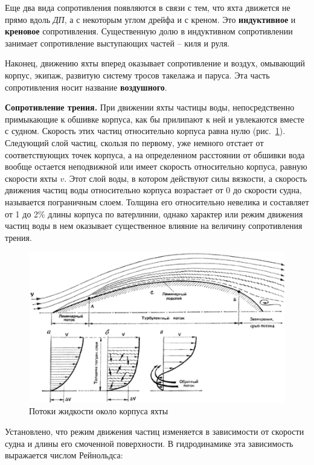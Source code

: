 \documentclass[a4paper, 12pt, twoside, final, book, russian, fittopage, cyremdash]{ncc}
\newcommand{\ris}[1]{\ref{fig:#1}}
\begin{document}
Еще два вида сопротивления появляются в связи с тем, что яхта движется не прямо вдоль \textit{ДП}, а с некоторым углом дрейфа и с креном. Это \textbf{индуктивное} и \textbf{креновое} сопротивления. Существенную долю в индуктивном сопротивлении занимает сопротивление выступающих частей \--- киля и руля.

Наконец, движению яхты вперед оказывает сопротивление и воздух, омывающий корпус, экипаж, развитую систему тросов такелажа и паруса. Эта часть сопротивления носит название \textbf{воздушного}. 

\textbf{Сопротивление трения.} При движении яхты частицы воды, непосредственно примыкающие к обшивке корпуса, как бы прилипают к ней и увлекаются вместе с судном. Скорость этих частиц относительно корпуса равна нулю (рис.~\ris{14}). Следующий слой частиц, скользя по первому, уже немного отстает от соответствующих точек корпуса, а на определенном расстоянии от обшивки вода вообще остается неподвижной или имеет скорость относительно корпуса, равную скорости яхты $v$. Этот слой воды, в котором действуют силы вязкости, а скорость движения частиц воды относительно корпуса возрастает от 0 до скорости судна, называется пограничным слоем. Толщина его относительно невелика и составляет от 1 до 2\% длины корпуса по ватерлинии, однако характер или режим движения частиц воды в нем оказывает существенное влияние на величину сопротивления трения.

\begin{figure}[htb]
  \centering
  \includegraphics[scale=0.5]{0014.jpg}
  \caption{Потоки жидкости около корпуса яхты}
  \label{fig:14}
\end{figure}

Установлено, что режим движения частиц изменяется в зависимости от скорости судна и длины его смоченной поверхности. В гидродинамике эта зависимость выражается числом Рейнольдса:
\end{document}
